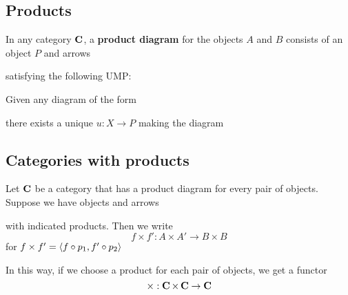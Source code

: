 \documentclass[11pt]{article}
\begin{document}
\subsection{Products}
\label{sec:org4a583bb}
\begin{definition}[]
In any category \(\operatorname{\textbf{C}}\), a \textbf{product diagram} for the objects \(A\) and \(B\)
consists of an object \(P\) and arrows
\begin{center}\end{center}

satisfying the following UMP:

Given any diagram of the form
\begin{center}\end{center}

there exists a unique \(u:X\to P\) making the diagram
\begin{center}\end{center}
\end{definition}

\subsection{Categories with products}
\label{sec:org3d51972}
Let \(\operatorname{\textbf{C}}\) be a category that has a product diagram for every pair of
objects. Suppose we have objects and arrows
\begin{center}\end{center}
with indicated products. Then we write
\begin{equation*}
f\times f':A\times A'\to B\times B
\end{equation*}
for \(f\times f'=\langle f\circ p_1,f'\circ p_2\rangle\)
\begin{center}\end{center}     In this way, if we choose a product for each
pair of objects, we get a functor
\begin{equation*}
\times:\operatorname{\textbf{C}}\times\operatorname{\textbf{C}}\to\operatorname{\textbf{C}}
\end{equation*}
\end{document}
